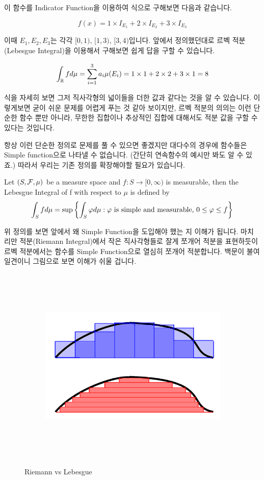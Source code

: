 \documentclass[final]{IEEEphot}
\begin{document}
이 함수를 Indicator Function을 이용하여 식으로 구해보면 다음과 같습니다.

$$ f(x) = 1\times I_{E_1} + 2\times I_{E_2} + 3\times I_{E_3} $$

이때 $E_1,E_2,E_3$는 각각 $[0,1), \, [1, 3),\, [3,4)$입니다.
앞에서 정의했던대로 르벡 적분(Lebesgue Integral)을 이용해서 구해보면 쉽게 답을 구할 수 있습니다.

$$\int_{\mathbb{R}} f d\mu = \sum_{i=1}^{3} a_i \mu(E_i) = 1\times1 + 2\times 2 + 3\times 1 = 8$$

식을 자세히 보면 그저 직사각형의 넓이들을 더한 값과 같다는 것을 알 수 있습니다. 이렇게보면 굳이 쉬운 문제를 어렵게 푸는 것 같아 보이지만, 르벡 적분의 의의는 이런 단순한 함수 뿐만 아니라, 무한한 집합이나 추상적인 집합에 대해서도 적분 값을 구할 수 있다는 것입니다.

\VS

\HS 항상 이런 단순한 정의로 문제를 풀 수 있으면 좋겠지만 대다수의 경우에 함수들은 Simple function으로 나타낼 수 없습니다. (간단히 연속함수의 예시만 봐도 알 수 있죠.) 따라서 우리는 기존 정의를 확장해야할 필요가 있습니다.

\newpage

\begin{definition}
	Let $(S, \mathcal{F}, \mu)$ be a measure space and $f: S \rightarrow [0,\infty)$ is measurable, then the Lebesgue Integral of f with respect to $\mu$ is defined by
	$$ \int_S f d\mu = \sup\left\{ \int_S \varphi d\mu : \varphi\text{ is simple and measurable, } 0 \leq \varphi \leq f  \right\}$$
	
	\HL
\end{definition}

위 정의를 보면 앞에서 왜 Simple Function을 도입해야 했는 지 이해가 됩니다. 마치 리만 적분(Riemann Integral)에서 작은 직사각형들로 잘게 쪼개어 적분을 표현하듯이 르벡 적분에서는 함수를 Simple Function으로 열심히 쪼개어 적분합니다. 백문이 불여일견이니 그림으로 보면 이해가 쉬울 겁니다.

\begin{figure}[h!]
	\centering
	\begin{subfigure}{.8\textwidth}
		\centering
		\includegraphics[width=\textwidth, height=9.5cm]{riemann_vs_lebesgue.png}
	\end{subfigure}
	\caption{Riemann vs Lebesgue}
\end{figure}
\end{document}
